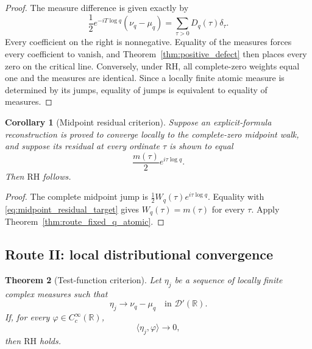 \documentclass[11pt]{amsart}
\numberwithin{equation}{section}
\theoremstyle{plain}
\newtheorem{theorem}{Theorem}[section]
\newtheorem{corollary}[theorem]{Corollary}
\theoremstyle{definition}
\theoremstyle{remark}
\newcommand{\RH}{\mathrm{RH}}
\newcommand{\1}{\mathbf{1}}
\begin{document}
\begin{proof}
The measure difference is given exactly by
\begin{equation}
\frac12e^{-iT\log q}(\nu_q-\mu_q)
=
\sum_{\tau>0}D_q(\tau)\delta_\tau.
\label{eq:route_atomic_positive_measure}
\end{equation}
Every coefficient on the right is nonnegative.  Equality of the measures
forces every coefficient to vanish, and Theorem~\ref{thm:positive_defect}
then places every zero on the critical line.  Conversely, under \(\RH\),
all complete-zero weights equal one and the measures are identical.  Since
a locally finite atomic measure is determined by its jumps, equality of
jumps is equivalent to equality of measures.
\end{proof}

\begin{corollary}[Midpoint residual criterion]
\label{cor:midpoint_residual_criterion}
Suppose an explicit-formula reconstruction is proved to converge locally to
the complete-zero midpoint walk, and suppose its residual at every ordinate
\(\tau\) is shown to equal
\begin{equation}
\frac{m(\tau)}2e^{i\tau\log q}.
\label{eq:midpoint_residual_target}
\end{equation}
Then \(\RH\) follows.
\end{corollary}

\begin{proof}
The complete midpoint jump is
\(\frac12W_q(\tau)e^{i\tau\log q}\).  Equality with
\eqref{eq:midpoint_residual_target} gives
\(W_q(\tau)=m(\tau)\) for every \(\tau\).  Apply
Theorem~\ref{thm:route_fixed_q_atomic}.
\end{proof}

\subsection{Route II: local distributional convergence}
\label{subsec:route_distributional}

\begin{theorem}[Test-function criterion]
\label{thm:test_function_criterion}
Let \(\eta_j\) be a sequence of locally finite complex measures such that
\begin{equation}
\eta_j\longrightarrow\nu_q-\mu_q
\quad\text{in }\mathcal D'(\mathbb R).
\label{eq:test_measure_identification}
\end{equation}
If, for every \(\varphi\in C_c^\infty(\mathbb R)\),
\begin{equation}
\langle\eta_j,\varphi\rangle\longrightarrow0,
\label{eq:test_measure_zero}
\end{equation}
then \(\RH\) holds.
\end{theorem}
\end{document}
